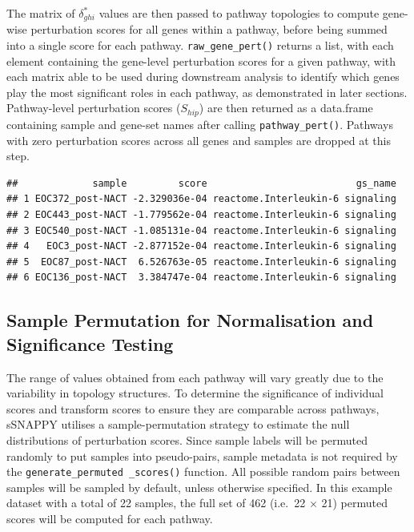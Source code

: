 \documentclass[9pt,a4paper,]{extarticle}
\newenvironment{Shaded}{\begin{snugshade}}{\end{snugshade}}
\newcommand{\FunctionTok}[1]{\textcolor[rgb]{0.13,0.29,0.53}{\textbf{#1}}}
\newcommand{\NormalTok}[1]{#1}
\newcommand{\OtherTok}[1]{\textcolor[rgb]{0.56,0.35,0.01}{#1}}
\newcommand{\SpecialCharTok}[1]{\textcolor[rgb]{0.81,0.36,0.00}{\textbf{#1}}}
\begin{document}
The matrix of \(\delta_{ghi}^*\) values are then passed to pathway topologies to compute gene-wise perturbation scores for all genes within a pathway, before being summed into a single score for each pathway.
\texttt{raw\_gene\_pert()} returns a list, with each element containing the gene-level perturbation scores for a given pathway, with each matrix able to be used during downstream analysis to identify which genes play the most significant roles in each pathway, as demonstrated in later sections.
Pathway-level perturbation scores (\(S_{hip}\)) are then returned as a data.frame containing sample and gene-set names after calling \texttt{pathway\_pert()}.
Pathways with zero perturbation scores across all genes and samples are dropped at this step.

\begin{Shaded}
\end{Shaded}

\begin{verbatim}
##             sample         score                          gs_name
## 1 EOC372_post-NACT -2.329036e-04 reactome.Interleukin-6 signaling
## 2 EOC443_post-NACT -1.779562e-04 reactome.Interleukin-6 signaling
## 3 EOC540_post-NACT -1.085131e-04 reactome.Interleukin-6 signaling
## 4   EOC3_post-NACT -2.877152e-04 reactome.Interleukin-6 signaling
## 5  EOC87_post-NACT  6.526763e-05 reactome.Interleukin-6 signaling
## 6 EOC136_post-NACT  3.384747e-04 reactome.Interleukin-6 signaling
\end{verbatim}

\hypertarget{sample-permutation-for-normalisation-and-significance-testing}{%
\subsection{Sample Permutation for Normalisation and Significance Testing}\label{sample-permutation-for-normalisation-and-significance-testing}}

The range of values obtained from each pathway will vary greatly due to the variability in topology structures.
To determine the significance of individual scores and transform scores to ensure they are comparable across pathways, sSNAPPY utilises a sample-permutation strategy to estimate the null distributions of perturbation scores.
Since sample labels will be permuted randomly to put samples into pseudo-pairs, sample metadata is not required by the \texttt{generate\_permuted\ \_scores()} function.
All possible random pairs between samples will be sampled by default, unless otherwise specified.
In this example dataset with a total of 22 samples, the full set of 462 (i.e.~22 \(\times\) 21) permuted scores will be computed for each pathway.
\end{document}
